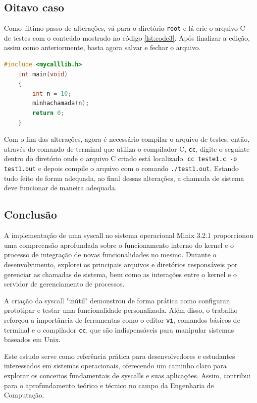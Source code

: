 \documentclass[12pt]{article}
\begin{document}
\subsection{Oitavo caso}
Como último passo de alterações, vá para o diretório \texttt{root} e lá crie o arquivo C de testes com o conteúdo mostrado no código \ref{lst:code3}. Após finalizar a edição,
 assim como anteriormente, basta agora salvar e fechar o arquivo.
\begin{lstlisting}[caption={Programa em C para somar dois números}, label={lst:code3}, language=C]
    #include <mycalllib.h>
	int main(void)
	{
		int n = 10;
		minhachamada(n);
		return 0;
	}
\end{lstlisting}
Com o fim das alterações, agora é necessário compilar o arquivo de testes, então, através do comando de terminal que utiliza o compilador C, \lstinline{cc}, digite o seguinte
dentro do diretório onde o arquivo C criado está localizado. \lstinline{cc teste1.c -o test1.out} e depois compile o arquivo com o comando \lstinline{./test1.out}. Estando tudo
feito de forma adequada, ao final dessas alterações, a chamada de sistema deve funcionar de maneira adequada.


\subsection{Conclusão}

A implementação de uma syscall no sistema operacional Minix 3.2.1 proporcionou uma compreensão aprofundada sobre o funcionamento interno do kernel e o
processo de integração de novas funcionalidades no mesmo. Durante o desenvolvimento, explorei os principais arquivos e diretórios responsáveis por gerenciar as chamadas
de sistema, bem como as interações entre o kernel e o servidor de gerenciamento de processos.

A criação da syscall "inútil" demonstrou de forma prática como configurar, prototipar e testar uma funcionalidade personalizada. Além disso, o trabalho reforçou a
importância de ferramentas como o editor \texttt{vi}, comandos básicos de terminal e o compilador \texttt{cc}, que são indispensáveis para manipular sistemas baseados em Unix.

Este estudo serve como referência prática para desenvolvedores e estudantes interessados em sistemas operacionais, oferecendo um caminho claro para explorar os conceitos
fundamentais de syscalls e suas aplicações. Assim, contribui para o aprofundamento teórico e técnico no campo da Engenharia de Computação.



\newpage

\end{document}
